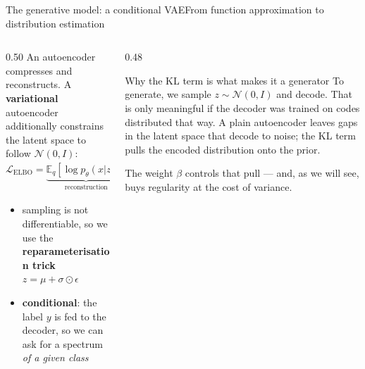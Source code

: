 \documentclass[aspectratio=169, 11pt]{beamer}
\begin{document}
\begin{frame}{The generative model: a conditional VAE}{From function approximation to distribution estimation}
  \vspace{0.3em}
  \begin{columns}[T]
    \begin{column}{0.50\textwidth}
      \small
      An autoencoder compresses and reconstructs. A \textbf{variational}
      autoencoder additionally constrains the latent space to follow
      $\mathcal{N}(0,I)$:
      \[
        \mathcal{L}_{\text{ELBO}} =
        \underbrace{\mathbb{E}_{q}[\log p_\theta(x|z)]}_{\text{reconstruction}}
        \;-\;
        \underbrace{D_{KL}(q_\phi(z|x)\,\|\,p(z))}_{\text{regularisation}}
      \]
      \vspace{-0.3em}
      \begin{itemize}\setlength\itemsep{0.4em}
        \item sampling is not differentiable, so we use the
              \textbf{reparameterisation trick}
              $z = \mu + \sigma \odot \epsilon$
        \item \textbf{conditional}: the label $y$ is fed to the decoder, so we
              can ask for a spectrum \emph{of a given class}
      \end{itemize}
    \end{column}
    \begin{column}{0.48\textwidth}
      \begin{block}{\small Why the KL term is what makes it a generator}
        \small
        To generate, we sample $z\sim\mathcal{N}(0,I)$ and decode. That is only
        meaningful if the decoder was \alert{trained on codes distributed that
        way}. A plain autoencoder leaves gaps in the latent space that decode
        to noise; the KL term pulls the encoded distribution onto the prior.
      \end{block}
      \vspace{0.4em}
      \small The weight $\beta$ controls that pull --- and, as we will see,
      buys regularity at the cost of \alert{variance}.
    \end{column}
  \end{columns}
\end{frame}
\end{document}
